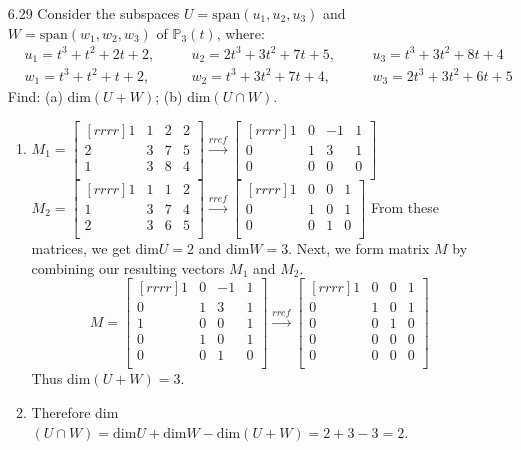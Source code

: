 \documentclass[12pt]{article}
\theoremstyle{definition}
\theoremstyle{plain}
\begin{document}
\begin{enumerate}
\item[6.29] Consider the subspaces $U=\mathrm{span}(u_1,u_2,u_3)$ and $W=\mathrm{span}(w_1,w_2,w_3)$ of $\mathbb{P}_3(t)$, where:
\begin{align*}
&u_1=t^3+t^2+2t+2, \quad &&u_2=2t^3+3t^2+7t+5, \quad &&u_3=t^3+3t^2+8t+4\\
&w_1=t^3+t^2+t+2, \quad &&w_2=t^3+3t^2+7t+4, \quad &&w_3=2t^3+3t^2+6t+5
\end{align*}
Find: (a) dim$(U+W)$; (b) dim$(U \cap W)$.
	\begin{enumerate}
	\item $M_1=\begin{bmatrix}[rrrr]1&1&2&2\\2&3&7&5\\1&3&8&4\\\end{bmatrix} \xrightarrow[]{rref} \begin{bmatrix}[rrrr]1&0&-1&1\\0&1&3&1\\0&0&0&0\\\end{bmatrix}$\\
	$M_2=\begin{bmatrix}[rrrr]1&1&1&2\\1&3&7&4\\2&3&6&5\\\end{bmatrix} \xrightarrow[]{rref} \begin{bmatrix}[rrrr]1&0&0&1\\0&1&0&1\\0&0&1&0\\\end{bmatrix}$
	From these matrices, we get dim$U=2$ and dim$W=3$.
	Next, we form matrix $M$ by combining our resulting vectors $M_1$ and $M_2$.
	\[ M = \begin{bmatrix}[rrrr]1&0&-1&1\\0&1&3&1\\1&0&0&1\\0&1&0&1\\0&0&1&0\\\end{bmatrix} \xrightarrow[]{rref} \begin{bmatrix}[rrrr]1&0&0&1\\0&1&0&1\\0&0&1&0\\0&0&0&0\\0&0&0&0\\\end{bmatrix} \]
	Thus dim$(U+W)=3$.\\
	\item Therefore dim$(U \cap W) = \mathrm{dim}U+\mathrm{dim}W-\mathrm{dim}(U+W)=2+3-3=2$.
	\end{enumerate}


\end{enumerate}
\end{document}
